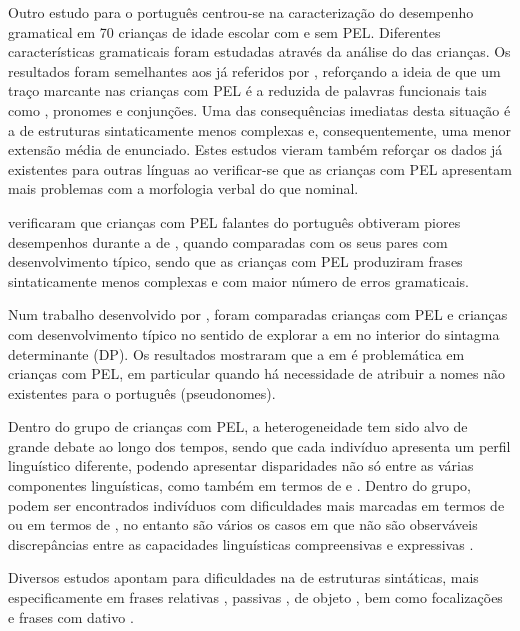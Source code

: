 \documentclass[output=paper]{LSP/langsci}
\begin{document}
Outro estudo para o português \citep{araujo2007} centrou-se na caracterização do desempenho gramatical em 70 crianças de idade escolar com e sem PEL. Diferentes características gramaticais foram estudadas através da análise do  das crianças. Os resultados foram semelhantes aos já referidos por \cite{puglisi_etal2005}, reforçando a ideia de que um traço marcante nas crianças com PEL é a reduzida  de palavras funcionais tais como , pronomes e conjunções. Uma das consequências imediatas desta situação é a  de estruturas sintaticamente menos complexas e, consequentemente, uma menor extensão média de enunciado. Estes estudos vieram também reforçar os dados já existentes para outras línguas ao verificar-se que as crianças com PEL apresentam mais problemas com a morfologia verbal do que nominal. 

\cite{befilopes_etal2008} verificaram que crianças com PEL falantes do português obtiveram piores desempenhos durante a  de , quando comparadas com os seus pares com desenvolvimento típico, sendo que as crianças com PEL produziram frases sintaticamente menos complexas e com maior número de erros gramaticais.

Num trabalho desenvolvido por \cite{silveira2011}, foram comparadas crianças com PEL e crianças com desenvolvimento típico no sentido de explorar a  em  no interior do sintagma determinante (DP). Os resultados mostraram que a  em  é problemática em crianças com PEL, em particular quando há necessidade de atribuir  a nomes não existentes para o português (pseudonomes). 

Dentro do grupo de crianças com PEL, a heterogeneidade tem sido alvo de grande debate ao longo dos tempos, sendo que cada indivíduo apresenta um perfil linguístico diferente, podendo apresentar disparidades não só entre as várias componentes linguísticas, como também em termos de  e . Dentro do grupo, podem ser encontrados indivíduos com dificuldades mais marcadas em termos de  ou em termos de , no entanto são vários os casos em que não são observáveis discrepâncias entre as capacidades linguísticas compreensivas e expressivas \citep{gillamkamhi2010}. 

Diversos estudos apontam para dificuldades na  de estruturas sintáticas, mais especificamente em frases relativas \citep{friedmannnovogrodsky2004,costa_etal2009}, passivas \citep{vanderlely1996},  de objeto \citep{friedmannnovogrodsky2011}, bem como focalizações e frases com  dativo \citep{vanderlelyharris1990,friedmannnovogrodsky2007}.
\end{document}
